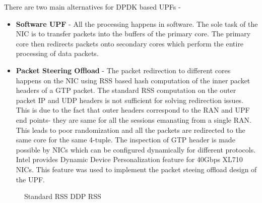 There are two main alternatives for DPDK based UPFs -
\begin{itemize}
	\item \textbf{Software UPF} - All the processing happens in software. The sole task of
	      the NIC is to transfer packets into the buffers of the primary core. The primary core then
	      redirects packets onto secondary cores which perform the entire processing of data packets.
	\item \textbf{Packet Steering Offload} - The packet redirection to different cores happens on the NIC using RSS based hash
	      computation of the inner packet headers of a GTP packet. The standard RSS computation on the outer packet IP and UDP headers is not sufficient for solving redirection issues. This is due to the fact that outer headers correspond to the RAN and UPF end points- they are same for all the sessions emanating from a single RAN. This leads to poor randomization and all the packets are redirected to the same core for the same 4-tuple. The inspection of GTP header is made possible by NICs which can be configured dynamically for different protocols. Intel provides Dynamic Device Personalization feature for 40Gbps XL710 NICs. This feature was used to implement the packet steeing offload design of the UPF.
\end{itemize}
\begin{figure}[htbp]
	\centering


	\caption{ Standard RSS   DDP RSS}
	\label{figure:HashFields}
\end{figure}

